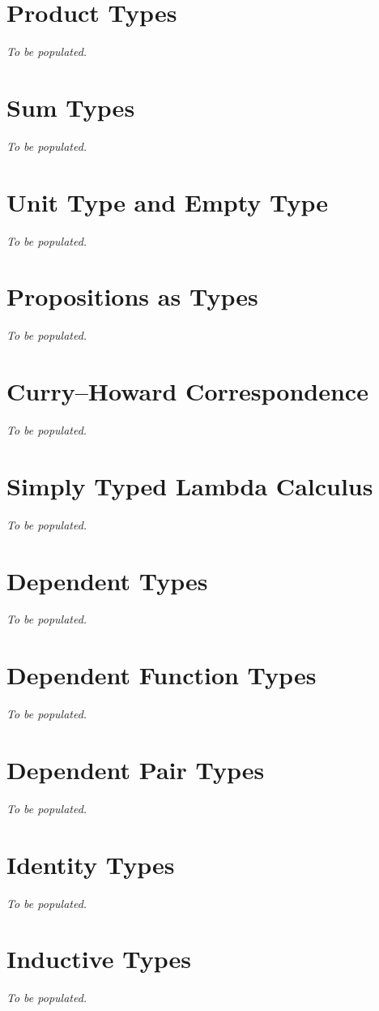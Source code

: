 \section{Product Types}
\textit{To be populated.}

\section{Sum Types}
\textit{To be populated.}

\section{Unit Type and Empty Type}
\textit{To be populated.}

\section{Propositions as Types}
\textit{To be populated.}

\section{Curry--Howard Correspondence}
\textit{To be populated.}

\section{Simply Typed Lambda Calculus}
\textit{To be populated.}

\section{Dependent Types}
\textit{To be populated.}

\section{Dependent Function Types}
\textit{To be populated.}

\section{Dependent Pair Types}
\textit{To be populated.}

\section{Identity Types}
\textit{To be populated.}

\section{Inductive Types}
\textit{To be populated.}

